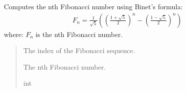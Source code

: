 \documentclass[a4paper,14pt,oneside,english,openany]{sphinxmanual}
\begin{document}
\begin{fulllineitems}
\label{\detokenize{newtest:newtest.fibonacci}}
\pysigstartsignatures
{}
\pysigstopsignatures
\sphinxAtStartPar
Computes the nth Fibonacci number using Binet’s formula:
\begin{equation*}
\begin{split}F_n = \frac{1}{\sqrt{5}} \left( \left( \frac{1 + \sqrt{5}}{2} \right)^n - \left( \frac{1 - \sqrt{5}}{2} \right)^n \right)\end{split}
\end{equation*}
\sphinxAtStartPar
where:
\sphinxhyphen{} \(F_n\) is the nth Fibonacci number.
\begin{quote}\begin{description}
\sphinxAtStartPar
{} \textendash{} The index of the Fibonacci sequence.

\sphinxAtStartPar
The nth Fibonacci number.

\sphinxAtStartPar
int

\end{description}\end{quote}

\end{fulllineitems}

\end{document}
